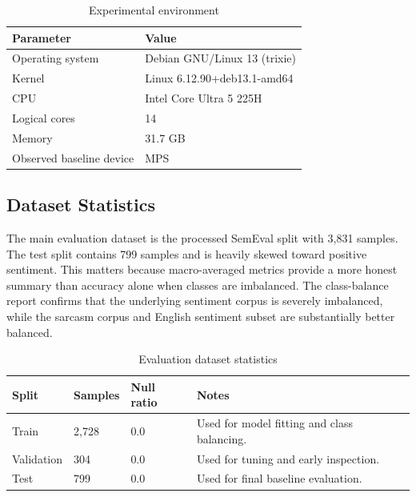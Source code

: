 \documentclass[12pt, a4paper]{article}
\begin{document}
\begin{table}[H]
\centering
\caption{Experimental environment}
\begin{tabularx}{\textwidth}{@{} p{3.5cm} X @{}}
\toprule
\textbf{Parameter} & \textbf{Value} \\
\midrule
Operating system & Debian GNU/Linux 13 (trixie) \\
Kernel & Linux 6.12.90+deb13.1-amd64 \\
CPU & Intel Core Ultra 5 225H \\
Logical cores & 14 \\
Memory & 31.7 GB \\
Observed baseline device & MPS \\
\bottomrule
\end{tabularx}
\end{table}

\subsection{Dataset Statistics}
The main evaluation dataset is the processed SemEval split with 3,831 samples. The test split contains 799 samples and is heavily skewed toward positive sentiment. This matters because macro-averaged metrics provide a more honest summary than accuracy alone when classes are imbalanced. The class-balance report confirms that the underlying sentiment corpus is severely imbalanced, while the sarcasm corpus and English sentiment subset are substantially better balanced.

\begin{table}[H]
\centering
\caption{Evaluation dataset statistics}
\begin{tabularx}{\textwidth}{@{} p{3cm} p{2cm} p{2.2cm} X @{}}
\toprule
\textbf{Split} & \textbf{Samples} & \textbf{Null ratio} & \textbf{Notes} \\
\midrule
Train & 2,728 & 0.0 & Used for model fitting and class balancing. \\
Validation & 304 & 0.0 & Used for tuning and early inspection. \\
Test & 799 & 0.0 & Used for final baseline evaluation. \\
\bottomrule
\end{tabularx}
\end{table}
\end{document}
